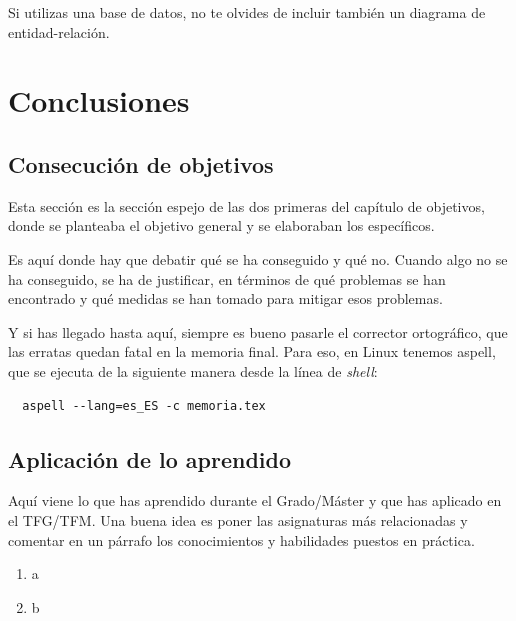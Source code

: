 \documentclass[a4paper, 12pt]{book}
\begin{document}
Si utilizas una base de datos, no te olvides de incluir también un diagrama de entidad-relación.




\cleardoublepage
\chapter{Conclusiones}
\label{chap:conclusiones}


\section{Consecución de objetivos}
\label{sec:consecucion-objetivos}

Esta sección es la sección espejo de las dos primeras del capítulo de objetivos, donde se planteaba el objetivo general y se elaboraban los específicos.

Es aquí donde hay que debatir qué se ha conseguido y qué no. 
Cuando algo no se ha conseguido, se ha de justificar, en términos de qué problemas se han encontrado y qué medidas se han tomado para mitigar esos problemas.

Y si has llegado hasta aquí, siempre es bueno pasarle el corrector ortográfico, que las erratas quedan fatal en la memoria final.
Para eso, en Linux tenemos aspell, que se ejecuta de la siguiente manera desde la línea de \emph{shell}:

\begin{verbatim}
  aspell --lang=es_ES -c memoria.tex
\end{verbatim}

\section{Aplicación de lo aprendido}
\label{sec:aplicacion}

Aquí viene lo que has aprendido durante el Grado/Máster y que has aplicado en el TFG/TFM. Una buena idea es poner las asignaturas más relacionadas y comentar en un párrafo los conocimientos y habilidades puestos en práctica.

\begin{enumerate}
  \item a
  \item b
\end{enumerate}
\end{document}
